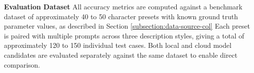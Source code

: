 \textbf{Evaluation Dataset}
All accuracy metrics are computed against a benchmark dataset of approximately 40 to 50 character presets with known ground truth parameter values, as described in Section \ref{subsection:data-source-col} Each preset is paired with multiple prompts across three description styles, giving a total of approximately 120 to 150 individual test cases. Both local and cloud model candidates are evaluated separately against the same dataset to enable direct comparison.
